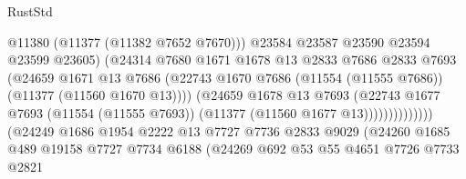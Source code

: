 \begin{lexlean}{RustStd}
\begin{coremodule}
                                            @11380
                                            (@11377 (@11382 @7652 @7670)))
                                          @23584
                                          @23587
                                          @23590
                                          @23594
                                          @23599
                                          @23605)
                                        (@24314
                                          @7680
                                          @1671
                                          @1678
                                          @13
                                          @2833
                                          @7686
                                          @2833
                                          @7693
                                          (@24659
                                            @1671
                                            @13
                                            @7686
                                            (@22743
                                              @1670
                                              @7686
                                              (@11554 (@11555 @7686))
                                              (@11377 (@11560 @1670 @13))))
                                          (@24659
                                            @1678
                                            @13
                                            @7693
                                            (@22743
                                              @1677
                                              @7693
                                              (@11554 (@11555 @7693))
                                              (@11377 (@11560 @1677 @13))))))))))))))
                      (@24249
                        @1686
                        @1954
                        @2222
                        @13
                        @7727
                        @7736
                        @2833
                        @9029
                        (@24260
                          @1685
                          @489
                          @19158
                          @7727
                          @7734
                          @6188
                          (@24269
                            @692
                            @53
                            @55
                            @4651
                            @7726
                            @7733
                            @2821

\end{coremodule}
\end{lexlean}
